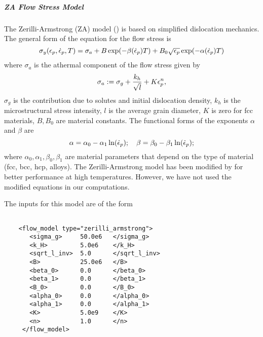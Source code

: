   \subparagraph{ZA Flow Stress Model}
  The Zerilli-Armstrong (ZA) model (\cite{Zerilli87,Zerilli93,Zerilli04})
  is based on simplified dislocation mechanics.  The general form of the
  equation for the flow stress is
  \begin{equation}
    \sigma_y(\Ep,\Epdot{},T) = 
      \sigma_a + B\exp(-\beta(\Epdot{}) T) + 
                           B_0\sqrt{\Ep}\exp(-\alpha(\Epdot{}) T)
  \end{equation}
  where $\sigma_a$ is the athermal component of the flow stress given by
  \begin{equation}
    \sigma_a := \sigma_g + \frac{k_h}{\sqrt{l}} + K\Ep^n,
  \end{equation}
  $\sigma_g$ is the contribution due to solutes and initial dislocation
  density, $k_h$ is the microstructural stress intensity, $l$ is the
  average grain diameter, $K$ is zero for fcc materials,
  $B, B_0$ are material constants.  The functional forms of the exponents
  $\alpha$ and $\beta$ are
  \begin{equation}
    \alpha = \alpha_0 - \alpha_1 \ln(\Epdot{}); \quad
    \beta = \beta_0 - \beta_1 \ln(\Epdot{}); 
  \end{equation}
  where $\alpha_0, \alpha_1, \beta_0, \beta_1$ are material parameters that
  depend on the type of material (fcc, bcc, hcp, alloys).  The Zerilli-Armstrong
  model has been modified by \cite{Abed05} for better performance at high
  temperatures.  However, we have not used the modified equations in our
  computations.

  The inputs for this model are of the form
  \begin{Verbatim}[fontsize=\footnotesize]
    
    <flow_model type="zerilli_armstrong">
       <sigma_g>     50.0e6   </sigma_g>
       <k_H>         5.0e6    </k_H>
       <sqrt_l_inv>  5.0      </sqrt_l_inv>
       <B>           25.0e6   </B>
       <beta_0>      0.0      </beta_0>
       <beta_1>      0.0      </beta_1>
       <B_0>         0.0      </B_0>
       <alpha_0>     0.0      </alpha_0>
       <alpha_1>     0.0      </alpha_1>
       <K>           5.0e9    </K>
       <n>           1.0      </n>
     </flow_model>
  \end{Verbatim}


